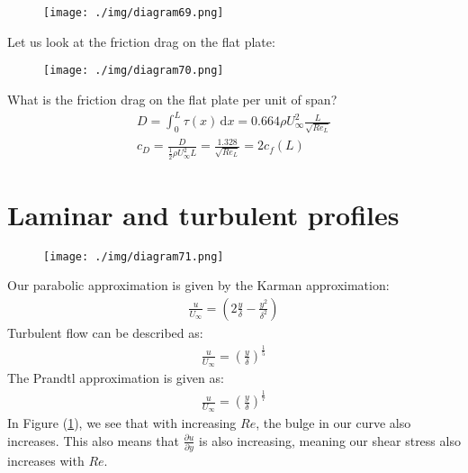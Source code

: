 \begin{figure}[H]
  \centering
  \texttt{[image: ./img/diagram69.png]}
  \caption{}
\end{figure}
Let us look at the friction drag on the flat plate:
\begin{figure}[H]
  \centering
  \texttt{[image: ./img/diagram70.png]}
  \caption{}
\end{figure}
What is the friction drag on the flat plate per unit of span?
\begin{align}
  D = \int_{0}^{L} \tau(x) \,\mathrm{d}x = 0.664 \rho U_\infty^2 \frac{L}{\sqrt{Re_L}} \\
  c_D = \frac{D}{\frac{1}{2}\rho U_\infty^2 L} = \frac{1.328}{\sqrt{Re_L}} = 2 c_f (L)
\end{align}
\section{Laminar and turbulent profiles}
\begin{figure}[H]
  \centering
  \texttt{[image: ./img/diagram71.png]}
  \caption{}
  \label{lamturbpfs1}
\end{figure}
Our parabolic approximation is given by the Karman approximation:
\begin{align}
  \frac{u}{U_\infty} = \left( 2 \frac{y}{\delta} - \frac{y^2}{\delta^2}\right)
\end{align}
Turbulent flow can be described as:
\begin{align}
  \frac{u}{U_\infty} = \left(\frac{y}{\delta}\right)^{\frac{1}{5}}
\end{align}
The Prandtl approximation is given as:
\begin{align}
  \frac{u}{U_\infty} = \left(\frac{y}{\delta}\right)^{\frac{1}{7}}
\end{align}
In Figure (\ref{lamturbpfs1}), we see that with increasing $Re$, the bulge in our curve also increases. This also means that $\frac{\partial u}{\partial y}$ is also increasing, meaning our shear stress also increases with $Re$.
